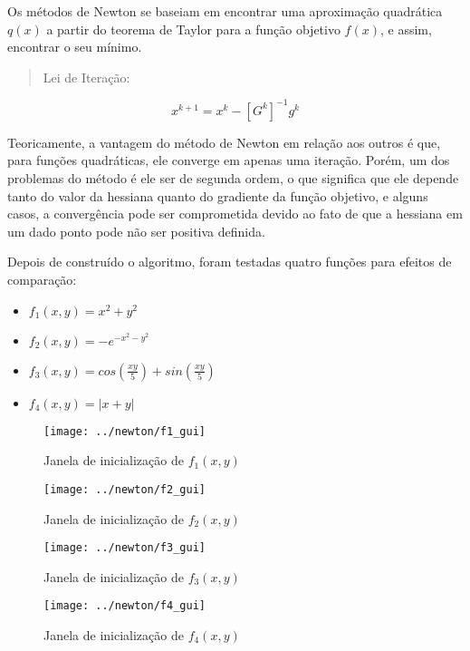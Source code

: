 Os métodos de Newton se baseiam em encontrar uma aproximação quadrática $ q(x) $ a partir do teorema de Taylor para a função objetivo $ f(x) $, e assim, encontrar o seu mínimo.
	
	\begin{quote}
		\centering
		Lei de Iteração:
	\end{quote}
	
	\begin{equation}
		x^{k+1} = x^k - [G^k]^{-1}g^k
	\end{equation}

Teoricamente, a vantagem do método de Newton em relação aos outros é que, para funções quadráticas, ele converge em apenas uma iteração. Porém, um dos problemas do método é ele ser de segunda ordem, o que significa que ele depende tanto do valor da hessiana quanto do gradiente da função objetivo, e alguns casos, a convergência pode ser comprometida devido ao fato de que a hessiana em um dado ponto pode não ser positiva definida.

Depois de construído o algoritmo, foram testadas quatro funções para efeitos de comparação:

\begin{itemize}
	\item $ f_1(x,y) = x^2 + y^2$
	\item $ f_2(x,y) = -e^{-x^2 -y^2}$
	\item $ f_3(x,y) = cos(\frac{xy}{5})+sin(\frac{xy}{5}) $
	\item $ f_4(x,y) = |x+y| $
\end{itemize}

\newpage

\begin{figure}[H]
	\begin{center}
		\texttt{[image: ../newton/f1\_gui]}   
		\caption{Janela de inicialização de $ f_1(x,y) $}
		\label{fig:newton_f1_gui}
	\end{center}
\end{figure}

\begin{figure}[H]
	\begin{center}
		\texttt{[image: ../newton/f2\_gui]}   
		\caption{Janela de inicialização de $ f_2(x,y) $}
		\label{fig:newton_f2_gui}
	\end{center}
\end{figure}

\begin{figure}[H]
	\begin{center}
		\texttt{[image: ../newton/f3\_gui]}   
		\caption{Janela de inicialização de $ f_3(x,y) $}
		\label{fig:newton_f3_gui}
	\end{center}
\end{figure}


\begin{figure}[H]
	\begin{center}
		\texttt{[image: ../newton/f4\_gui]}   
		\caption{Janela de inicialização de $ f_4(x,y) $}
		\label{fig:newton_f4_gui}
	\end{center}
\end{figure}
